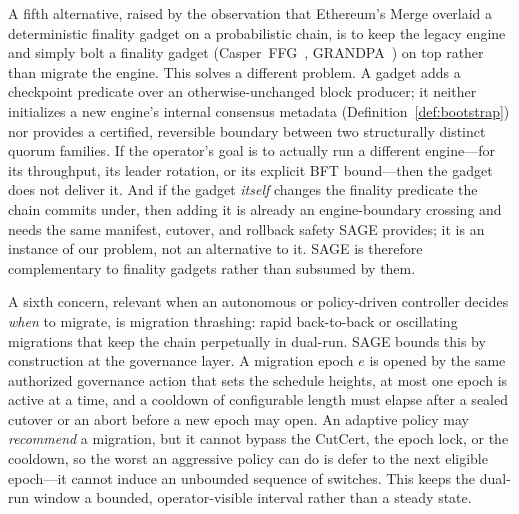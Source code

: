 \documentclass[journal]{IEEEtran}
\theoremstyle{definition}
\theoremstyle{remark}
\begin{document}
A fifth alternative, raised by the observation that Ethereum's Merge overlaid a deterministic
finality gadget on a probabilistic chain, is to keep the legacy engine and simply bolt a
finality gadget (Casper~FFG~\cite{casperffg}, GRANDPA~\cite{grandpa}) on top rather than migrate
the engine. This solves a different problem. A gadget adds a checkpoint predicate over an
otherwise-unchanged block producer; it neither initializes a new engine's internal consensus
metadata (Definition~\ref{def:bootstrap}) nor provides a certified, reversible boundary between
two structurally distinct quorum families. If the operator's goal is to actually run a different
engine---for its throughput, its leader rotation, or its explicit BFT bound---then the gadget does
not deliver it. And if the gadget \emph{itself} changes the finality predicate the chain commits
under, then adding it is already an engine-boundary crossing and needs the same manifest, cutover,
and rollback safety SAGE provides; it is an instance of our problem, not an alternative to it. SAGE
is therefore complementary to finality gadgets rather than subsumed by them.

A sixth concern, relevant when an autonomous or policy-driven controller decides \emph{when} to
migrate, is migration thrashing: rapid back-to-back or oscillating migrations that keep the chain
perpetually in dual-run. SAGE bounds this by construction at the governance layer. A migration
epoch $e$ is opened by the same authorized governance action that sets the schedule heights, at
most one epoch is active at a time, and a cooldown of configurable length must elapse after a
sealed cutover or an abort before a new epoch may open. An adaptive policy may \emph{recommend} a
migration, but it cannot bypass the CutCert, the epoch lock, or the cooldown, so the worst an
aggressive policy can do is defer to the next eligible epoch---it cannot induce an unbounded
sequence of switches. This keeps the dual-run window a bounded, operator-visible interval rather
than a steady state.
\end{document}
